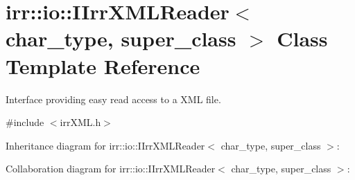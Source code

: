 \hypertarget{classirr_1_1io_1_1_i_irr_x_m_l_reader}{\section{irr\+:\+:io\+:\+:I\+Irr\+X\+M\+L\+Reader$<$ char\+\_\+type, super\+\_\+class $>$ Class Template Reference}
\label{classirr_1_1io_1_1_i_irr_x_m_l_reader}
}


Interface providing easy read access to a X\+M\+L file.  




{\ttfamily \#include $<$irr\+X\+M\+L.\+h$>$}



Inheritance diagram for irr\+:\+:io\+:\+:I\+Irr\+X\+M\+L\+Reader$<$ char\+\_\+type, super\+\_\+class $>$\+:


Collaboration diagram for irr\+:\+:io\+:\+:I\+Irr\+X\+M\+L\+Reader$<$ char\+\_\+type, super\+\_\+class $>$\+:
